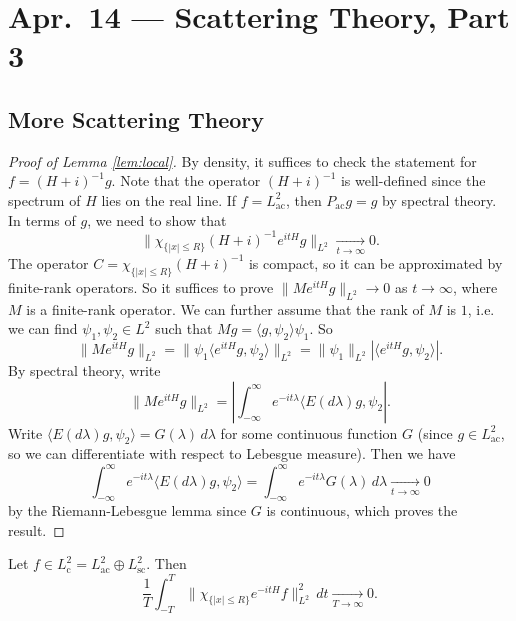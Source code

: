 \chapter{Apr.~14 --- Scattering Theory, Part 3}

\section{More Scattering Theory}

\begin{proof}[Proof of Lemma \ref{lem:local}]
  By density, it suffices to check
  the statement for $f = (H + i)^{-1} g$. Note
  that the operator
  $(H + i)^{-1}$ is well-defined since
  the spectrum of $H$ lies on the real line. If
  $f = L^2_{\mathrm{ac}}$, then
  $P_{\mathrm{ac}} g = g$ by spectral theory.
  In terms of $g$, we need to show that
  \[
    \|\chi_{\{|x| \le R\}} (H + i)^{-1} e^{itH} g\|_{L^2} \xrightarrow[t \to \infty]{} 0.
  \]
  The operator $C = \chi_{\{|x| \le R\}} (H + i)^{-1}$
  is compact, so it can be approximated
  by finite-rank operators. So it suffices
  to prove $\|M e^{itH} g\|_{L^2} \to 0$
  as $t \to \infty$, where $M$ is a finite-rank
  operator. We can further assume that
  the rank of $M$ is $1$, i.e. we can find
  $\psi_1, \psi_2 \in L^2$ such that
  $Mg = \langle g, \psi_2 \rangle \psi_1$. So
  \[
    \|M e^{itH} g \|_{L^2}
    = \| \psi_1 \langle e^{itH} g, \psi_2 \rangle \|_{L^2}
    = \| \psi_1 \|_{L^2} |\langle e^{itH} g, \psi_2 \rangle|.
  \]
  By spectral theory, write
  \[
    \|M e^{itH} g \|_{L^2}
    = \left|
    \int_{-\infty}^\infty e^{-it \lambda}
    \langle E(d\lambda) g, \psi_2
    \right|.
  \]
  Write $\langle E(d\lambda) g, \psi_2 \rangle = G(\lambda)\, d\lambda$ for some continuous
  function $G$ (since
  $g \in L^2_{\mathrm{ac}}$, so we can
  differentiate with respect to Lebesgue measure).
  Then we have
  \[
    \int_{-\infty}^\infty e^{-it\lambda}
    \langle E(d\lambda) g, \psi_2 \rangle
    = \int_{-\infty}^\infty e^{-it\lambda} G(\lambda)\, d\lambda
    \xrightarrow[t \to \infty]{} 0
  \]
  by the Riemann-Lebesgue lemma since
  $G$ is continuous, which proves the result.
\end{proof}

\begin{theorem}
  Let $f \in L^2_{\mathrm{c}} = L^2_{\mathrm{ac}} \oplus L^2_{\mathrm{sc}}$.
  Then
  \[
    \frac{1}{T} \int_{-T}^T \| \chi_{\{|x| \le R\}} e^{-itH} f \|_{L^2}^2\, dt
    \xrightarrow[T \to \infty]{} 0.
  \]
\end{theorem}

